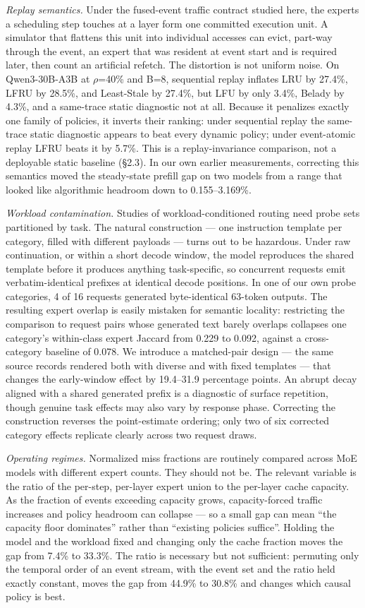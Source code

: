 \documentclass[
  10pt,
  letterpaper,
  10pt]{article}
\begin{document}
\emph{Replay semantics.} Under the fused-event traffic contract studied
here, the experts a scheduling step touches at a layer form one
committed execution unit. A simulator that flattens this unit into
individual accesses can evict, part-way through the event, an expert
that was resident at event start and is required later, then count an
artificial refetch. The distortion is not uniform noise. On
Qwen3-30B-A3B at \ensuremath{\rho}=40\% and B=8, sequential replay
inflates LRU by 27.4\%, LFRU by 28.5\%, and Least-Stale by 27.4\%, but
LFU by only 3.4\%, Belady by 4.3\%, and a same-trace static diagnostic
not at all. Because it penalizes exactly one family of policies, it
inverts their ranking: under sequential replay the same-trace static
diagnostic appears to beat every dynamic policy; under event-atomic
replay LFRU beats it by 5.7\%. This is a replay-invariance comparison,
not a deployable static baseline (§2.3). In our own earlier
measurements, correcting this semantics moved the steady-state prefill
gap on two models from a range that looked like algorithmic headroom
down to 0.155--3.169\%.

\emph{Workload contamination.} Studies of workload-conditioned routing
need probe sets partitioned by task. The natural construction --- one
instruction template per category, filled with different payloads ---
turns out to be hazardous. Under raw continuation, or within a short
decode window, the model reproduces the shared template before it
produces anything task-specific, so concurrent requests emit
verbatim-identical prefixes at identical decode positions. In one of our
own probe categories, 4 of 16 requests generated byte-identical 63-token
outputs. The resulting expert overlap is easily mistaken for semantic
locality: restricting the comparison to request pairs whose generated
text barely overlaps collapses one category's within-class expert
Jaccard from 0.229 to 0.092, against a cross-category baseline of 0.078.
We introduce a matched-pair design --- the same source records rendered
both with diverse and with fixed templates --- that changes the
early-window effect by 19.4--31.9 percentage points. An abrupt decay
aligned with a shared generated prefix is a diagnostic of surface
repetition, though genuine task effects may also vary by response phase.
Correcting the construction reverses the point-estimate ordering; only
two of six corrected category effects replicate clearly across two
request draws.

\emph{Operating regimes.} Normalized miss fractions are routinely
compared across MoE models with different expert counts. They should not
be. The relevant variable is the ratio of the per-step, per-layer expert
union to the per-layer cache capacity. As the fraction of events
exceeding capacity grows, capacity-forced traffic increases and policy
headroom can collapse --- so a small gap can mean ``the capacity floor
dominates'' rather than ``existing policies suffice''. Holding the model
and the workload fixed and changing only the cache fraction moves the
gap from 7.4\% to 33.3\%. The ratio is necessary but not sufficient:
permuting only the temporal order of an event stream, with the event set
and the ratio held exactly constant, moves the gap from 44.9\% to 30.8\%
and changes which causal policy is best.
\end{document}
